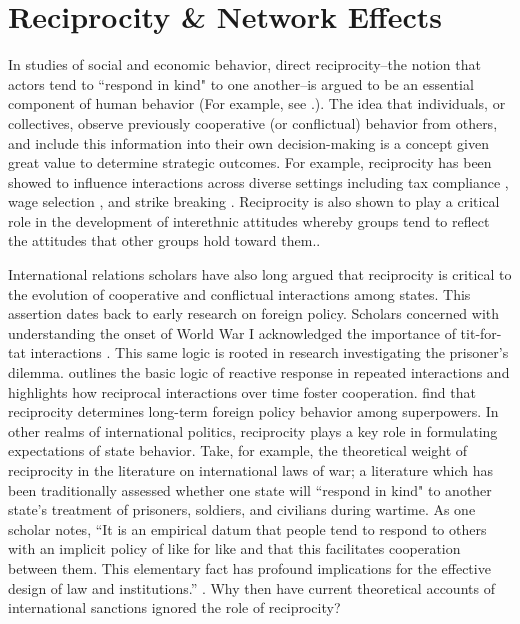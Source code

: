 
\section*{Reciprocity \& Network Effects}
\label{neteffects}
In studies of social and economic behavior, direct reciprocity--the notion that actors tend to ``respond in kind" to one another--is argued to be an essential component of human behavior (For example, see \cite{bolton:1998, charness:2002, charness:2004, cox:2007, cox:2004}.). The idea that individuals, or collectives, observe previously cooperative (or conflictual) behavior from others, and include this information into their own decision-making is a concept given great value to determine strategic outcomes. For example, reciprocity has been showed to influence  interactions across diverse settings including tax compliance \citep{smith:1990}, wage selection \citep{campbell:1997}, and strike breaking \citep{brett:1998}. Reciprocity is also shown to play a critical role in the development of interethnic attitudes whereby groups tend to reflect the attitudes that other groups hold toward them.\citep{berry:1979}. %

International relations scholars have also long argued that reciprocity is critical to the evolution of cooperative and conflictual interactions among states. This assertion dates back to early research on foreign policy. Scholars concerned with understanding the onset of World War I acknowledged the importance of tit-for-tat interactions \citep{holsti1972}. This same logic is rooted in research investigating the prisoner's dilemma. \cite{axelrod:1985} outlines the basic logic of reactive response in repeated interactions and highlights how reciprocal interactions over time foster cooperation. \cite{rajmaira:1990} find that reciprocity determines long-term foreign policy behavior among superpowers. In other realms of international politics, reciprocity plays a key role in formulating expectations of state behavior. Take, for example, the theoretical weight of reciprocity in the literature on international laws of war; a literature which has been traditionally assessed whether one state will ``respond in kind" to another state's treatment of prisoners, soldiers, and civilians during wartime. As one scholar notes, ``It is an empirical datum that people tend to respond to others with an implicit policy of like for like and that this facilitates cooperation between them. This elementary fact has profound implications for the effective design of law and institutions.'' \cite[p. 19]{osiel:2009}. Why then have current theoretical accounts of international sanctions ignored the role of reciprocity? 

